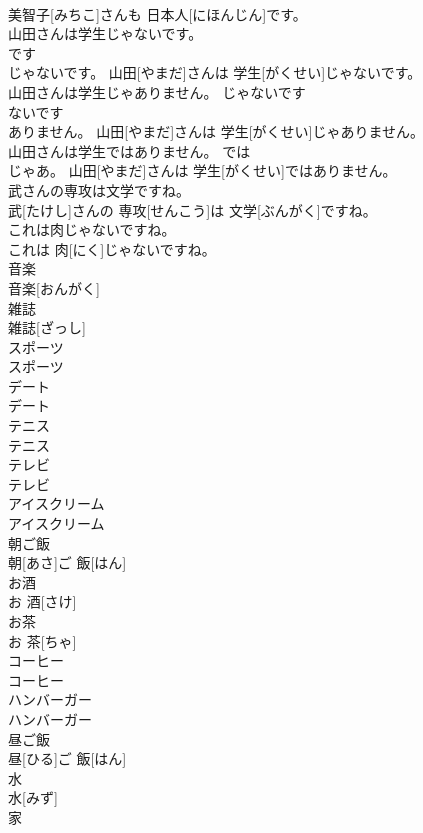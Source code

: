 \documentclass[8pt]{extreport}
\begin{document}
\begin{CJK}{UTF8}{min}
\\	美智子[みちこ]さんも 日本人[にほんじん]です。	
\\	山田さんは学生じゃないです。	
\\	です 
\\	じゃないです。	山田[やまだ]さんは 学生[がくせい]じゃないです。	
\\	山田さんは学生じゃありません。	じゃないです 
\\	ないです 
\\	ありません。	山田[やまだ]さんは 学生[がくせい]じゃありません。	
\\	山田さんは学生ではありません。	では 
\\	じゃあ。	山田[やまだ]さんは 学生[がくせい]ではありません。	
\\	武さんの専攻は文学ですね。	
\\	武[たけし]さんの 専攻[せんこう]は 文学[ぶんがく]ですね。	
\\	これは肉じゃないですね。	
\\	これは 肉[にく]じゃないですね。	
\\	音楽	
\\	音楽[おんがく]		
\\	雑誌	
\\	雑誌[ざっし]		
\\	スポーツ	
\\	スポーツ		
\\	デート	
\\	デート		
\\	テニス	
\\	テニス		
\\	テレビ	
\\	テレビ		
\\	アイスクリーム	
\\	アイスクリーム		
\\	朝ご飯	
\\	朝[あさ]ご 飯[はん]		
\\	お酒	
\\	お 酒[さけ]		
\\	お茶	
\\	お 茶[ちゃ]		
\\	コーヒー	
\\	コーヒー		
\\	ハンバーガー	
\\	ハンバーガー		
\\	昼ご飯	
\\	昼[ひる]ご 飯[はん]		
\\	水	
\\	水[みず]		
\\	家	

\end{CJK}
\end{document}
